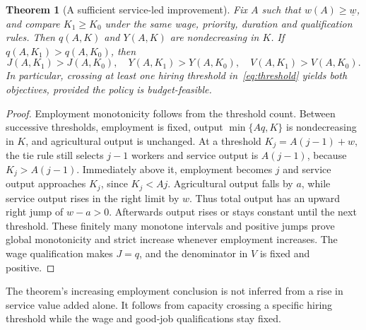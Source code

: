 \documentclass[11pt,a4paper]{article}
\newtheorem{theorem}{Theorem}[section]
\theoremstyle{definition}
\theoremstyle{remark}
\begin{document}
\begin{theorem}[A sufficient service-led improvement]\label{th:both}
Fix $A$ such that $w(A)\geq\underline w$, and compare $K_1\geq K_0$ under the same wage, priority, duration and qualification rules. Then $q(A,K)$ and $Y(A,K)$ are nondecreasing in $K$. If $q(A,K_1)>q(A,K_0)$, then
\[
 J(A,K_1)>J(A,K_0),\quad Y(A,K_1)>Y(A,K_0),
 \quad V(A,K_1)>V(A,K_0).
\]
In particular, crossing at least one hiring threshold in~\eqref{eq:threshold} yields both objectives, provided the policy is budget-feasible.
\end{theorem}
\begin{proof}
Employment monotonicity follows from the threshold count. Between successive thresholds, employment is fixed, output $\min\{Aq,K\}$ is nondecreasing in $K$, and agricultural output is unchanged. At a threshold $K_j=A(j-1)+w$, the tie rule still selects $j-1$ workers and service output is $A(j-1)$, because $K_j>A(j-1)$. Immediately above it, employment becomes $j$ and service output approaches $K_j$, since $K_j<Aj$. Agricultural output falls by $a$, while service output rises in the right limit by $w$. Thus total output has an upward right jump of $w-a>0$. Afterwards output rises or stays constant until the next threshold. These finitely many monotone intervals and positive jumps prove global monotonicity and strict increase whenever employment increases. The wage qualification makes $J=q$, and the denominator in $V$ is fixed and positive.
\end{proof}

The theorem's increasing employment conclusion is not inferred from a rise in service value added alone. It follows from capacity crossing a specific hiring threshold while the wage and good-job qualifications stay fixed.
\end{document}

